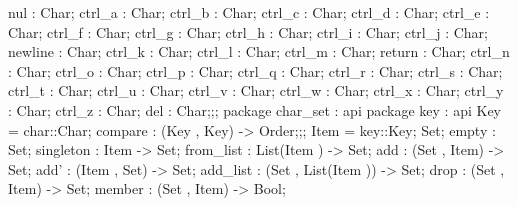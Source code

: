 {{{{                                        nul : Char;
                                        ctrl_a : Char;
                                        ctrl_b : Char;
                                        ctrl_c : Char;
                                        ctrl_d : Char;
                                        ctrl_e : Char;
                                        ctrl_f : Char;
                                        ctrl_g : Char;
                                        ctrl_h : Char;
                                        ctrl_i : Char;
                                        ctrl_j : Char;
                                        newline : Char;
                                        ctrl_k : Char;
                                        ctrl_l : Char;
                                        ctrl_m : Char;
                                        return : Char;
                                        ctrl_n : Char;
                                        ctrl_o : Char;
                                        ctrl_p : Char;
                                        ctrl_q : Char;
                                        ctrl_r : Char;
                                        ctrl_s : Char;
                                        ctrl_t : Char;
                                        ctrl_u : Char;
                                        ctrl_v : Char;
                                        ctrl_w : Char;
                                        ctrl_x : Char;
                                        ctrl_y : Char;
                                        ctrl_z : Char;
                                        del : Char;};;
                                package char_set
                                  : api {   package key
                                              : api {
                                                    Key  = char::Char;
                                                    compare : (Key , Key) -> Order;};;
                                        Item  = key::Key;
                                        Set;
                                        empty : Set;
                                        singleton : Item -> Set;
                                        from_list : List(Item ) -> Set;
                                        add : (Set , Item) -> Set;
                                        add' : (Item , Set) -> Set;
                                        add_list : (Set , List(Item )) -> Set;
                                        drop : (Set , Item) -> Set;
                                        member : (Set , Item) -> Bool;
}}}}
